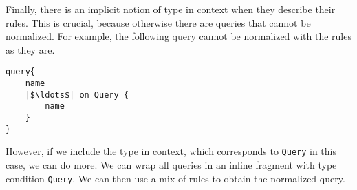 Finally, there is an implicit notion of type in context when they describe their rules. This is crucial, because otherwise there are queries that cannot be normalized. For example, the following query cannot be normalized with the rules as they are.
\begin{verbatim}
query{
    name
    |$\ldots$| on Query {
        name
    }
}
\end{verbatim}
However, if we include the type in context, which corresponds to \texttt{Query} in this case, we can do more. We can wrap all queries in an inline fragment with type condition \texttt{Query}. We can then use a mix of rules to obtain the normalized query.




